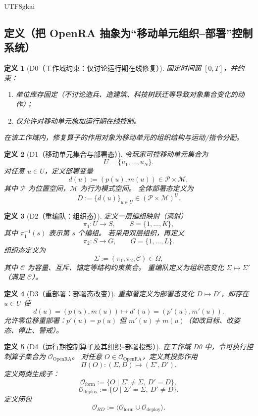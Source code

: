 \documentclass[12pt]{article}
\newtheorem{definition}{定义}[section]
\begin{document}
\begin{CJK*}{UTF8}{gkai}
\subsection{定义（把 OpenRA 抽象为“移动单元组织--部署”控制系统）}
\label{subsec:tex28-ch16-defs}

\begin{definition}[D0（工作域约束：仅讨论运行期在线修复）]
\label{def:tex28-ch16-d0}
固定时间窗 $[0,T]$，并约束：
\begin{enumerate}
  \item 单位库存固定（不讨论造兵、造建筑、科技树跃迁等导致对象集合变化的动作）；
  \item 仅允许对移动单元施加运行期在线控制。
\end{enumerate}
在该工作域内，修复算子的作用对象为移动单元的组织结构与运动/指令分配。
\end{definition}

\begin{definition}[D1（移动单元集合与部署态）]
\label{def:tex28-ch16-d1}
令玩家可控移动单元集合为
\[
  U=\{u_1,\dots,u_N\}.
\]
对任意 $u\in U$，定义部署变量
\[
  d(u):=(p(u),m(u))\in\mathcal P\times\mathcal M,
\]
其中 $\mathcal P$ 为位置空间，$\mathcal M$ 为行为模式空间。
全体部署态定义为
\[
  D:=\{d(u)\}_{u\in U}\in(\mathcal P\times\mathcal M)^U.
\]
\end{definition}

\begin{definition}[D2（重编队：组织态）]
\label{def:tex28-ch16-d2}
定义一层编组映射（满射）
\[
  \pi_1:U\to S,\qquad S=\{1,\dots,K\},
\]
其中 $\pi_1^{-1}(s)$ 表示第 $s$ 个编组。
若采用双层组织，再定义
\[
  \pi_2:S\to G,\qquad G=\{1,\dots,L\}.
\]
组织态定义为
\[
  \Sigma:=(\pi_1,\pi_2,\mathcal C)\in\Omega,
\]
其中 $\mathcal C$ 为容量、互斥、锚定等结构约束集合。
重编队定义为组织态变化 $\Sigma\mapsto\Sigma'$（满足 $\mathcal C$）。
\end{definition}

\begin{definition}[D3（重部署：部署态改变）]
\label{def:tex28-ch16-d3}
重部署定义为部署态变化 $D\mapsto D'$，即存在 $u\in U$ 使
\[
  d(u)=(p(u),m(u))\mapsto d'(u)=(p'(u),m'(u)).
\]
允许零位移重部署：$p'(u)=p(u)$ 但 $m'(u)\neq m(u)$（如改目标、改姿态、停止、警戒）。
\end{definition}

\begin{definition}[D4（运行期控制算子及其组织--部署投影）]
\label{def:tex28-ch16-d4}
在工作域 D0 中，令可执行控制算子集合为 $\mathcal O_{\mathrm{OpenRA}}$。
对任意 $O\in\mathcal O_{\mathrm{OpenRA}}$，定义其投影作用
\[
  \Pi(O):(\Sigma,D)\mapsto(\Sigma',D').
\]
定义两类生成子：
\[
  \mathcal O_{\mathrm{form}}
  :=\{O\mid \Sigma'\neq\Sigma,\ D'=D\},
\]
\[
  \mathcal O_{\mathrm{deploy}}
  :=\{O\mid \Sigma'=\Sigma,\ D'\neq D\}.
\]
定义闭包
\[
  \mathcal O_{RD}:=\langle \mathcal O_{\mathrm{form}}\cup\mathcal O_{\mathrm{deploy}}\rangle.
\]
\end{definition}


\end{CJK*}
\end{document}
